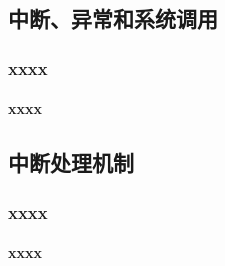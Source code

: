 \subsection{中断、异常和系统调用}
\begin{frame}
	\frametitle{xxxx}
	\framesubtitle{xxxx}
\end{frame}

\subsection{中断处理机制}

\begin{frame}
	\frametitle{xxxx}
	\framesubtitle{xxxx}
\end{frame}



